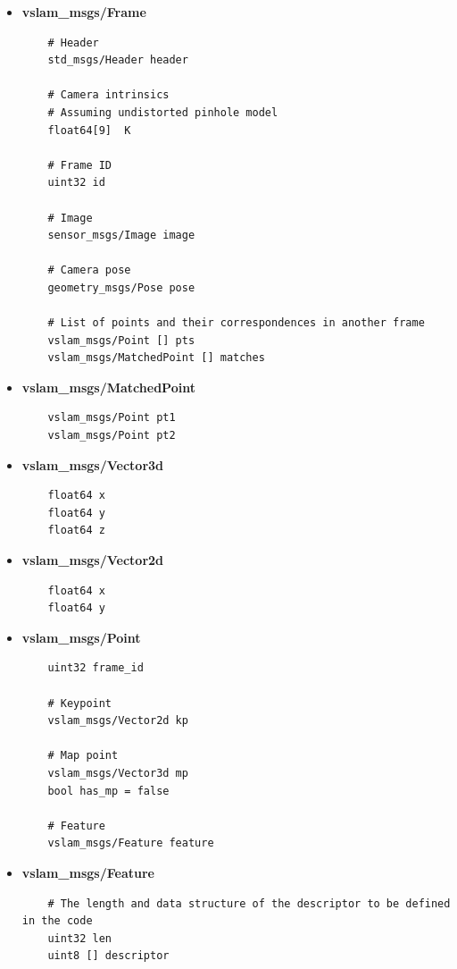 \begin{itemize}
  \item \textbf{vslam\_msgs/Frame}
  \begin{verbatim}
    # Header
    std_msgs/Header header

    # Camera intrinsics
    # Assuming undistorted pinhole model
    float64[9]  K 

    # Frame ID
    uint32 id 

    # Image
    sensor_msgs/Image image
    
    # Camera pose
    geometry_msgs/Pose pose
    
    # List of points and their correspondences in another frame
    vslam_msgs/Point [] pts
    vslam_msgs/MatchedPoint [] matches
  \end{verbatim}

  \item \textbf{vslam\_msgs/MatchedPoint}
  \begin{verbatim}
    vslam_msgs/Point pt1    
    vslam_msgs/Point pt2
  \end{verbatim}

  \item \textbf{vslam\_msgs/Vector3d}
  \begin{verbatim}
    float64 x
    float64 y  
    float64 z 
  \end{verbatim}

  \item \textbf{vslam\_msgs/Vector2d}
  \begin{verbatim}
    float64 x 
    float64 y 
  \end{verbatim}

  \item \textbf{vslam\_msgs/Point}
  \begin{verbatim}
    uint32 frame_id
    
    # Keypoint
    vslam_msgs/Vector2d kp

    # Map point
    vslam_msgs/Vector3d mp
    bool has_mp = false
    
    # Feature
    vslam_msgs/Feature feature    
  \end{verbatim}

  \item \textbf{vslam\_msgs/Feature}
  \begin{verbatim}
    # The length and data structure of the descriptor to be defined in the code
    uint32 len
    uint8 [] descriptor
  \end{verbatim}


\end{itemize}
